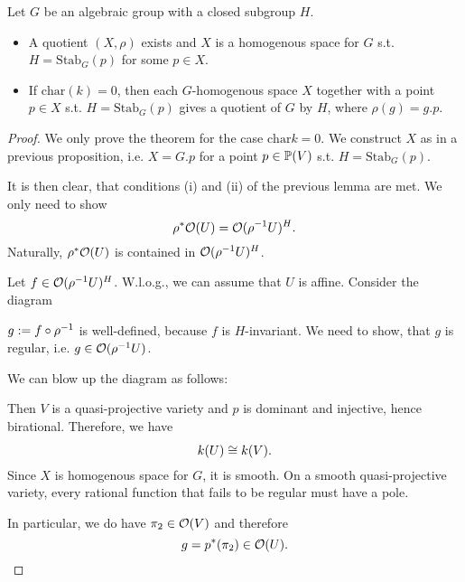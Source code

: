 \begin{theorem}
	Let $G$ be an algebraic group with a closed subgroup $H$.
	\begin{itemize}
		\item A quotient $(X, \rho)$ exists and $X$ is a homogenous space for $G$ s.t. $H = \mathrm{Stab}_G(p)$ for some $p \in X$.
		\item If $\mathrm{char}(k)= 0$, then each $G$-homogenous space $X$ together with a point $p\in X$ s.t. $H = \mathrm{Stab}_G(p)$ gives a quotient of $G$ by $H$, where $\rho(g) = g.p$.
	\end{itemize}
\end{theorem}
\begin{proof}
	We only prove the theorem for the case $\mathrm{char} k = 0$. We construct $X$ as in a previous proposition, i.e. $X = G.p$ for a point $p \in \P(V)$ s.t. $H = \mathrm{Stab}_G(p)$.
	
	It is then clear, that conditions (i) and (ii) of the previous lemma are met. We only need to show
	\[ \rho^*\O(U) = \O(\rho\i U)^H. \]
	Naturally, $\rho^*\O(U)$ is contained in $\O(\rho\i U)^H$.
	
	Let $f \in \O(\rho\i U)^H$. W.l.o.g., we can assume that $U$ is affine. Consider the diagram
	\begin{center}
	\end{center}
$g := f \circ \rho\i$ is well-defined, because $f$ is $H$-invariant. We need to show, that $g$ is regular, i.e. $g \in \O(\rho\i U)$.

We can blow up the diagram as follows:
	\begin{center}
\end{center}
Then $V$ is a quasi-projective variety and $p$ is dominant and injective, hence birational. Therefore, we have
\[ k(U) \isom{} k(V). \]
Since $X$ is homogenous space for $G$, it is smooth. On a smooth quasi-projective variety, every rational function that fails to be regular must have a pole.

In particular, we do have $\pi_2 \in \O(V)$ and therefore
\[ g = p^*(\pi_2) \in \O(U). \]
\end{proof}

